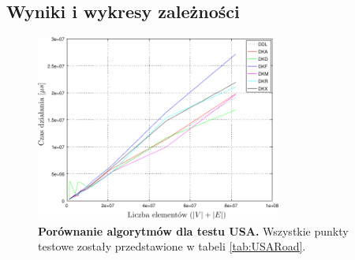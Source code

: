 \subsection{Wyniki i wykresy zależności}

\begin{figure}[!htbp]
	\centering
	\includegraphics[width=0.72\textwidth]{Chapter_IV/USA-road-d_psfrag.pdf}
	\caption{\textbf{ Porównanie algorytmów dla testu \textsc{USA}.} Wszystkie punkty testowe zostały przedstawione w tabeli \ref{tab:USARoad}.}\label{fig:plotUSA-road-d}
\end{figure}

